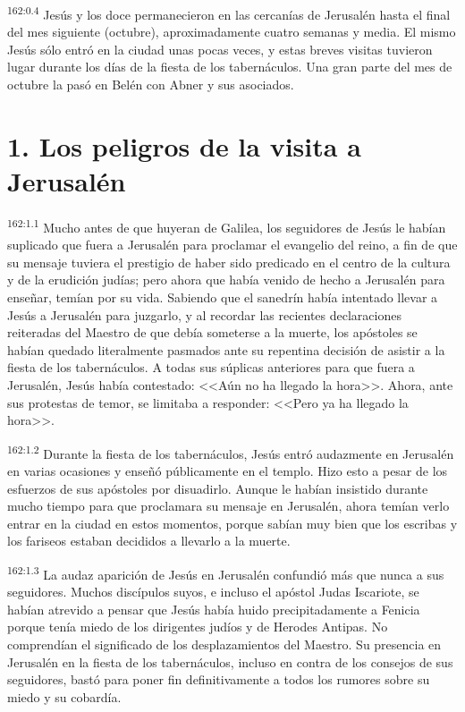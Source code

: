 \par 
\textsuperscript{162:0.4} Jesús y los doce permanecieron en las cercanías de Jerusalén hasta el final del mes siguiente (octubre), aproximadamente cuatro semanas y media. El mismo Jesús sólo entró en la ciudad unas pocas veces, y estas breves visitas tuvieron lugar durante los días de la fiesta de los tabernáculos. Una gran parte del mes de octubre la pasó en Belén con Abner y sus asociados.

\section*{1. Los peligros de la visita a Jerusalén}
\par 
\textsuperscript{162:1.1} Mucho antes de que huyeran de Galilea, los seguidores de Jesús le habían suplicado que fuera a Jerusalén para proclamar el evangelio del reino, a fin de que su mensaje tuviera el prestigio de haber sido predicado en el centro de la cultura y de la erudición judías; pero ahora que había venido de hecho a Jerusalén para enseñar, temían por su vida. Sabiendo que el sanedrín había intentado llevar a Jesús a Jerusalén para juzgarlo, y al recordar las recientes declaraciones reiteradas del Maestro de que debía someterse a la muerte, los apóstoles se habían quedado literalmente pasmados ante su repentina decisión de asistir a la fiesta de los tabernáculos. A todas sus súplicas anteriores para que fuera a Jerusalén, Jesús había contestado: <<Aún no ha llegado la hora>>. Ahora, ante sus protestas de temor, se limitaba a responder: <<Pero ya ha llegado la hora>>.

\par 
\textsuperscript{162:1.2} Durante la fiesta de los tabernáculos, Jesús entró audazmente en Jerusalén en varias ocasiones y enseñó públicamente en el templo. Hizo esto a pesar de los esfuerzos de sus apóstoles por disuadirlo. Aunque le habían insistido durante mucho tiempo para que proclamara su mensaje en Jerusalén, ahora temían verlo entrar en la ciudad en estos momentos, porque sabían muy bien que los escribas y los fariseos estaban decididos a llevarlo a la muerte.

\par 
\textsuperscript{162:1.3} La audaz aparición de Jesús en Jerusalén confundió más que nunca a sus seguidores. Muchos discípulos suyos, e incluso el apóstol Judas Iscariote, se habían atrevido a pensar que Jesús había huido precipitadamente a Fenicia porque tenía miedo de los dirigentes judíos y de Herodes Antipas. No comprendían el significado de los desplazamientos del Maestro. Su presencia en Jerusalén en la fiesta de los tabernáculos, incluso en contra de los consejos de sus seguidores, bastó para poner fin definitivamente a todos los rumores sobre su miedo y su cobardía.

